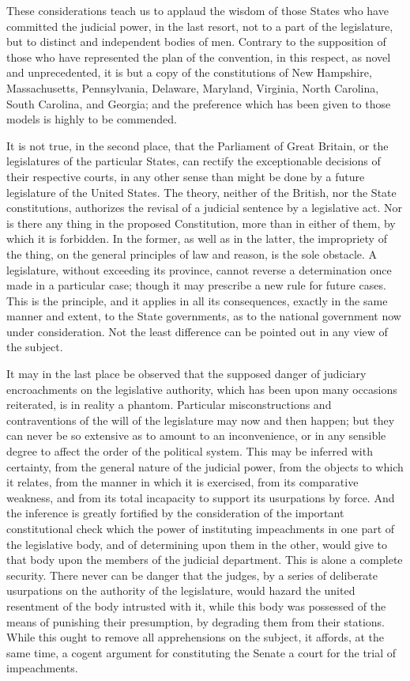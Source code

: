 These considerations teach us to applaud the wisdom of those States who have committed the judicial power, in the last resort, not to a part of the legislature, but to distinct and independent bodies of men. 
Contrary to the supposition of those who have represented the plan of the convention, in this respect, as novel and unprecedented, it is but a copy of the constitutions of New Hampshire, Massachusetts, Pennsylvania, Delaware, Maryland, Virginia, North Carolina, South Carolina, and Georgia; and the preference which has been given to those models is highly to be commended.

It is not true, in the second place, that the Parliament of Great Britain, or the legislatures of the particular States, can rectify the exceptionable decisions of their respective courts, in any other sense than might be done by a future legislature of the United States. 
The theory, neither of the British, nor the State constitutions, authorizes the revisal of a judicial sentence by a legislative act. 
Nor is there any thing in the proposed Constitution, more than in either of them, by which it is forbidden. 
In the former, as well as in the latter, the impropriety of the thing, on the general principles of law and reason, is the sole obstacle. 
A legislature, without exceeding its province, cannot reverse a determination once made in a particular case; though it may prescribe a new rule for future cases. 
This is the principle, and it applies in all its consequences, exactly in the same manner and extent, to the State governments, as to the national government now under consideration. 
Not the least difference can be pointed out in any view of the subject.

It may in the last place be observed that the supposed danger of judiciary encroachments on the legislative authority, which has been upon many occasions reiterated, is in reality a phantom. 
Particular misconstructions and contraventions of the will of the legislature may now and then happen; but they can never be so extensive as to amount to an inconvenience, or in any sensible degree to affect the order of the political system. 
This may be inferred with certainty, from the general nature of the judicial power, from the objects to which it relates, from the manner in which it is exercised, from its comparative weakness, and from its total incapacity to support its usurpations by force. 
And the inference is greatly fortified by the consideration of the important constitutional check which the power of instituting impeachments in one part of the legislative body, and of determining upon them in the other, would give to that body upon the members of the judicial department. 
This is alone a complete security. 
There never can be danger that the judges, by a series of deliberate usurpations on the authority of the legislature, would hazard the united resentment of the body intrusted with it, while this body was possessed of the means of punishing their presumption, by degrading them from their stations. 
While this ought to remove all apprehensions on the subject, it affords, at the same time, a cogent argument for constituting the Senate a court for the trial of impeachments.

